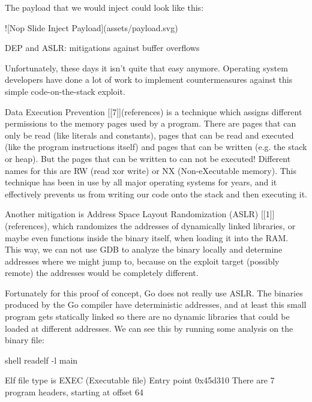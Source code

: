         The payload that we would inject could look like this:

        ![Nop Slide Inject Payload](assets/payload.svg)


        DEP and ASLR: mitigations against buffer overflows

        Unfortunately, these days it isn't quite that easy anymore. Operating system developers have done a lot of work to
        implement countermeasures against this simple code-on-the-stack exploit.

        Data Execution Prevention [[7]](references) is a technique which assigns different permissions to the memory pages used by a program. There
        are pages that can only be read (like literals and constants), pages that can be read and executed (like the program
        instructions itself) and pages that can be written (e.g. the stack or heap). But the pages that can be written to can
        not be executed! Different names for this are RW (read xor write) or NX (Non-eXecutable memory). This technique has been in
        use by all major operating systems for years, and it effectively prevents us from writing our code onto the stack and
        then executing it.

        Another mitigation is Address Space Layout Randomization (ASLR) [[1]](references), which randomizes the addresses of dynamically linked
        libraries, or maybe even functions inside the binary itself, when loading it into the RAM. This way, we can not use GDB
        to analyze the binary locally and determine addresses where we might jump to, because on the exploit target (possibly
        remote) the addresses would be completely different.

        Fortunately for this proof of concept, Go does not really use ASLR. The binaries produced by the Go compiler have
        deterministic addresses, and at least this small program gets statically linked so there are no dynamic libraries that
        could be loaded at different addresses. We can see this by running some analysis on the binary file:

        shell
        readelf -l main

        Elf file type is EXEC (Executable file)
        Entry point 0x45d310
        There are 7 program headers, starting at offset 64

